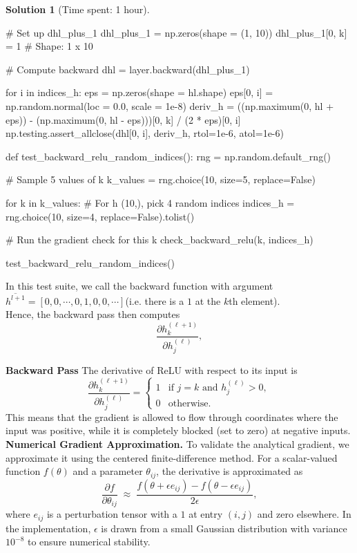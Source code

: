 \documentclass[11pt, reqno, letterpaper, twoside]{amsart}
\theoremstyle{plain}
\theoremstyle{definition}
\newtheorem{solution}[theorem]{Solution}
\begin{document}
\begin{solution}[Time spent: 1 hour]
\begin{enumerate}
\begin{python}
    # Set up dhl_plus_1
    dhl_plus_1 = np.zeros(shape = (1, 10))
    dhl_plus_1[0, k] = 1 # Shape: 1 x 10

    # Compute backward
    dhl = layer.backward(dhl_plus_1)

    for i in indices_h:
        eps = np.zeros(shape = hl.shape)
        eps[0, i] = np.random.normal(loc = 0.0, scale = 1e-8)
        deriv_h = ((np.maximum(0, hl + eps)) - (np.maximum(0, hl - eps)))[0, k] / (2 * eps)[0, i]
        np.testing.assert_allclose(dhl[0, i], deriv_h, rtol=1e-6, atol=1e-6)

def test_backward_relu_random_indices():
    rng = np.random.default_rng()

    # Sample 5 values of k
    k_values = rng.choice(10, size=5, replace=False)

    for k in k_values:
        # For h (10,), pick 4 random indices
        indices_h = rng.choice(10, size=4, replace=False).tolist()

        # Run the gradient check for this k
        check_backward_relu(k, indices_h)
        
test_backward_relu_random_indices()
\end{python}
In this test suite, we call the backward function with argument $\overline{h^{l + 1}} = \left[0, 0, \cdots, 0, 1, 0, 0, \cdots\right]$(i.e. there is a $1$ at the $k$th element). \\

Hence, the backward pass then computes
\[
\frac{\partial h^{(\ell+1)}_{k}}{\partial h^{(\ell)}_{j}},
\]


\textbf{Backward Pass}
The derivative of ReLU with respect to its input is
\[
\frac{\partial h^{(\ell+1)}_{k}}{\partial h^{(\ell)}_{j}}
= \begin{cases}
1 & \text{if } j=k \text{ and } h^{(\ell)}_{j} > 0, \\[6pt]
0 & \text{otherwise.}
\end{cases}
\]
This means that the gradient is allowed to flow through coordinates where the input was positive, while it is completely blocked (set to zero) at negative inputs. \\

\textbf{Numerical Gradient Approximation.}
To validate the analytical gradient, we approximate it using the centered finite-difference method. For a scalar-valued function $f(\theta)$ and a parameter $\theta_{ij}$, the derivative is approximated as
\[
\frac{\partial f}{\partial \theta_{ij}}
\;\approx\; \frac{f(\theta + \epsilon e_{ij}) - f(\theta - \epsilon e_{ij})}{2\epsilon},
\]
where $e_{ij}$ is a perturbation tensor with a $1$ at entry $(i,j)$ and zero elsewhere. In the implementation, $\epsilon$ is drawn from a small Gaussian distribution with variance $10^{-8}$ to ensure numerical stability. \\


\end{enumerate}
\end{solution}
\end{document}
